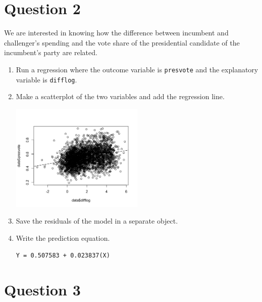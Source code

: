 \documentclass[12pt,letterpaper]{article}
\begin{document}
\section*{Question 2}
\noindent We are interested in knowing how the difference between incumbent and challenger's spending and the vote share of the presidential candidate of the incumbent's party are related.	\vspace{.25cm}
	\begin{enumerate}
		\item Run a regression where the outcome variable is \texttt{presvote} and the explanatory variable is \texttt{difflog}.
			\vspace{1cm}
		\item Make a scatterplot of the two variables and add the regression line. 
		
		\vspace{1cm}
		\includegraphics[width=0.5\textwidth]{Q2_Rplot.png}
		\vspace{1cm}
		\item Save the residuals of the model in a separate object.
			\vspace{1cm}
		\item Write the prediction equation.
		
		\texttt{Y = 0.507583 + 0.023837(X)}
	\end{enumerate}
	
	\newpage	
\section*{Question 3}
\end{document}
